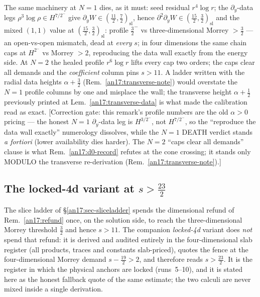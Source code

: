 \begin{remark}
\label{an17:calibration}
The same machinery at $N{=}1$ dies, as it must: seed
residual $r^4\log r$; the $\partial_y$-data legs $\rho^3\log\rho\in H^{7/2^-}$
give $\partial_yW\in(\tfrac{11}2,\tfrac72)_{\mathrm{sl}}$, hence
$\partial^2\partial_yW\in(\tfrac{15}2,\tfrac32)_{\mathrm{sl}}$ and the mixed
$(1,1)$ value at $(\tfrac{15}2,\tfrac32)_{\mathrm{sl}}$: profile $\tfrac32^-$
vs three-dimensional Morrey $>\tfrac32$ --- an open-vs-open mismatch, dead at
\emph{every} $s$; in four dimensions the same chain caps at $H^{2^-}$ vs Morrey
$>2$, reproducing the data wall exactly from the energy side. At $N{=}2$ the
healed profile $r^6\log r$ lifts every cap two orders; the caps clear all
demands and the \emph{coefficient} column pins $s>11$. A ladder written with the
radial data heights $\alpha+\tfrac32$ (Rem.~\ref{an17:transverse-note}) would
overstate the $N{=}1$ profile columns by one and misplace the wall; the
transverse height $\alpha+\tfrac12$ previously printed at
Lem.~\ref{an17:transverse-data} is what made the calibration read as exact.
\textup{[Correction gate: this remark's profile numbers are the old $\alpha>0$
pricing --- the honest $N{=}1$ $\partial_y$-data leg is $H^{3/2^-}$, not
$H^{7/2^-}$, so the ``reproduce the data wall exactly'' numerology dissolves,
while the $N{=}1$ DEATH verdict stands \emph{a fortiori} (lower availability
dies harder). The $N{=}2$ ``caps clear all demands'' clause is what
Rem.~\ref{an17:d0-record} refutes at the cone crossing; it stands only MODULO
the transverse re-derivation (Rem.~\ref{an17:transverse-note}).]}
\end{remark}

\subsection{The locked-4d variant at \texorpdfstring{$s>\tfrac{23}2$}{s>23/2}}
\label{an17:sec-slice4d}

The slice ladder of \S\ref{an17:sec-sliceladder} spends the dimensional refund of
Rem.~\ref{an17:refund} once, on the solution side, to reach the three-dimensional
Morrey threshold $\tfrac32$ and hence $s>11$. The companion \emph{locked-4d}
variant does \emph{not} spend that refund: it is derived and audited entirely in
the four-dimensional slab register (all products, traces and constants
slab-priced), quotes the fence at the four-dimensional Morrey demand
$s-\tfrac{19}2>2$, and therefore reads $s>\tfrac{23}2$. It is the register in
which the physical anchors are locked (runs~5--10), and it is stated here as the
honest fallback quote of the same estimate; the two calculi are never mixed
inside a single derivation.


